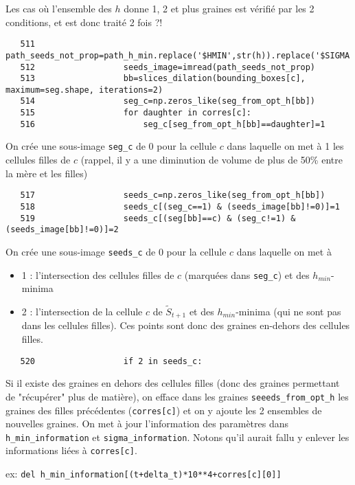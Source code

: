 \documentclass{article}
\def \mycolor {red}
\begin{document}
Les cas o\`u l'ensemble des $h$ donne 1, 2 et plus graines est v\'erifi\'e par les 2 conditions, et est donc trait\'e 2 fois ?!
\color{black}
\begin{verbatim} 
   511	                path_seeds_not_prop=path_h_min.replace('$HMIN',str(h)).replace('$SIGMA',str(sigma));
   512	                seeds_image=imread(path_seeds_not_prop)
   513	                bb=slices_dilation(bounding_boxes[c], maximum=seg.shape, iterations=2)
   514	                seg_c=np.zeros_like(seg_from_opt_h[bb])
   515	                for daughter in corres[c]:
   516	                    seg_c[seg_from_opt_h[bb]==daughter]=1
\end{verbatim} 
\color{\mycolor}
On cr\'ee une sous-image \verb|seg_c| de 0 pour la cellule $c$ dans laquelle on met \`a 1 les cellules filles de $c$ (rappel, il y a une diminution de volume de plus de 50\% entre la m\`ere et les filles) 
\color{black}
\begin{verbatim} 
   517	                seeds_c=np.zeros_like(seg_from_opt_h[bb])
   518	                seeds_c[(seg_c==1) & (seeds_image[bb]!=0)]=1
   519	                seeds_c[(seg[bb]==c) & (seg_c!=1) & (seeds_image[bb]!=0)]=2
\end{verbatim} 
\color{\mycolor}
On cr\'ee une sous-image \verb|seeds_c| de 0 pour la cellule $c$ dans laquelle on met \`a 
\begin{itemize}
\itemsep -1ex
\item 1 : l'intersection des cellules filles de $c$ (marqu\'ees dans \verb|seg_c|) et des $h_{min}$-minima
\item 2  : l'intersection de la cellule $c$ de $\tilde{S}_{t+1}$ et des $h_{min}$-minima (qui ne sont pas dans les cellules filles). Ces points sont donc des graines en-dehors des cellules filles.
\end{itemize}
\color{black}
\begin{verbatim} 
   520	                if 2 in seeds_c:
\end{verbatim} 
\color{\mycolor}
Si il existe des graines en dehors des cellules filles (donc des graines permettant de "r\'ecup\'erer" plus de mati\`ere),
on efface dans les graines  \verb|seeeds_from_opt_h| les graines des filles pr\'ec\'edentes (\verb|corres[c]|) et on y ajoute les 2 ensembles de nouvelles graines. On met \`a jour l'information des param\`etres dans \verb|h_min_information| et \verb|sigma_information|. Notons qu'il aurait fallu y enlever les informations li\'ees \`a \verb|corres[c]|.

ex: \verb|del h_min_information[(t+delta_t)*10**4+corres[c][0]]|
\end{document}
